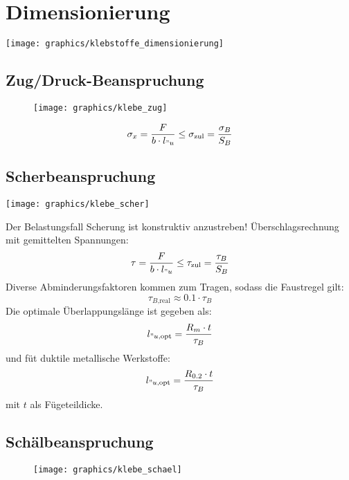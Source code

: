 \section{Dimensionierung} %
	\texttt{[image: graphics/klebstoffe\_dimensionierung]}

	\subsection{Zug/Druck-Beanspruchung} %
		\begin{wrapfigure}[0]{r}{.45\columnwidth}
			\vspace{-1.2cm}
			\texttt{[image: graphics/klebe\_zug]}
		\end{wrapfigure}
		
		\begin{equation*}
			\sigma_x = \frac{F}{b \cdot l_{"u}} \leq \sigma_{\text{zul}}= \frac{\sigma_B}{S_B}
		\end{equation*}
	\subsection{Scherbeanspruchung} %
		\begin{center}
			\texttt{[image: graphics/klebe\_scher]}
		\end{center}
		
		Der Belastungsfall Scherung ist konstruktiv anzustreben! Überschlagsrechnung mit gemittelten Spannungen:
		\begin{equation*}
			\tau = \frac{F}{b \cdot l_{"u}} \leq \tau_{\text{zul}} = \frac{\tau_B}{S_B}
		\end{equation*}
		Diverse Abminderungsfaktoren kommen zum Tragen, sodass die Faustregel gilt:
		\begin{equation*}
			\tau_{B\text{,real}} \approx 0.1 \cdot \tau_B
		\end{equation*}
		Die optimale Überlappungslänge ist gegeben als:
		\begin{equation*}
			l_{"u\text{,opt}} = \frac{R_m \cdot t}{\tau_B}
		\end{equation*}
		und füt duktile metallische Werkstoffe:
		\begin{equation*}
			l_{"u\text{,opt}} = \frac{R_{0.2} \cdot t}{\tau_B}
		\end{equation*}
		mit $t$ als Fügeteildicke.
	\subsection{Schälbeanspruchung} %
		\begin{wrapfigure}{r}{.45\columnwidth}
			\vspace{-1.4cm}
			\texttt{[image: graphics/klebe\_schael]}
		\end{wrapfigure}
		
